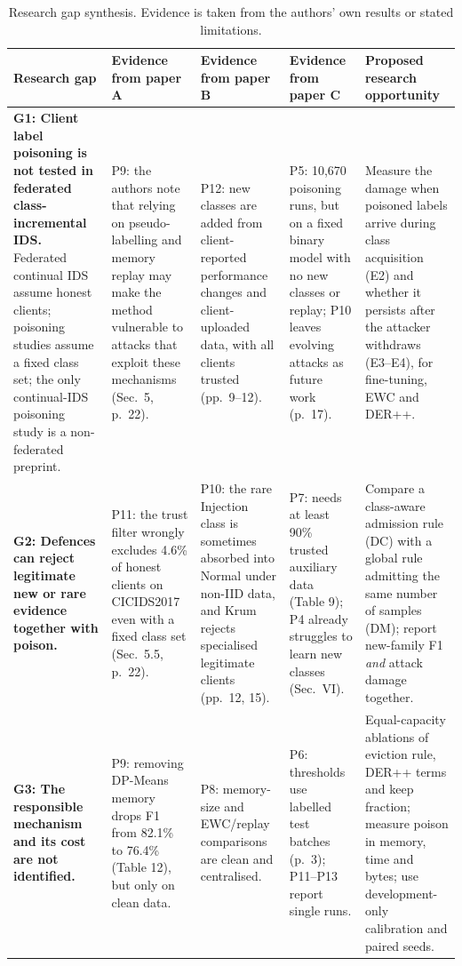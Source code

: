 \documentclass[10pt,a4paper]{article}
\begin{document}
\begin{landscape}
\begin{table}[p]
\centering\footnotesize
\caption{Research gap synthesis. Evidence is taken from the authors' own results or stated limitations.}
\label{tab:gaps}
\begin{tabularx}{\linewidth}{L{3.6cm}Y Y Y L{4.4cm}}
\toprule
Research gap & Evidence from paper A & Evidence from paper B & Evidence from paper C & Proposed research opportunity\\
\midrule
\textbf{G1: Client label poisoning is not tested in federated class-incremental IDS.} Federated continual IDS assume honest clients; poisoning studies assume a fixed class set; the only continual-IDS poisoning study is a non-federated preprint.
& P9: the authors note that relying on pseudo-labelling and memory replay may make the method vulnerable to attacks that exploit these mechanisms (Sec.~5, p.~22).
& P12: new classes are added from client-reported performance changes and client-uploaded data, with all clients trusted (pp.~9--12).
& P5: 10,670 poisoning runs, but on a fixed binary model with no new classes or replay; P10 leaves evolving attacks as future work (p.~17).
& Measure the damage when poisoned labels arrive during class acquisition (E2) and whether it persists after the attacker withdraws (E3--E4), for fine-tuning, EWC and DER++.\\[6pt]
\textbf{G2: Defences can reject legitimate new or rare evidence together with poison.}
& P11: the trust filter wrongly excludes 4.6\% of honest clients on CICIDS2017 even with a fixed class set (Sec.~5.5, p.~22).
& P10: the rare Injection class is sometimes absorbed into Normal under non-IID data, and Krum rejects specialised legitimate clients (pp.~12, 15).
& P7: needs at least 90\% trusted auxiliary data (Table 9); P4 already struggles to learn new classes (Sec.~VI).
& Compare a class-aware admission rule (DC) with a global rule admitting the same number of samples (DM); report new-family F1 \emph{and} attack damage together.\\[6pt]
\textbf{G3: The responsible mechanism and its cost are not identified.}
& P9: removing DP-Means memory drops F1 from 82.1\% to 76.4\% (Table 12), but only on clean data.
& P8: memory-size and EWC/replay comparisons are clean and centralised.
& P6: thresholds use labelled test batches (p.~3); P11--P13 report single runs.
& Equal-capacity ablations of eviction rule, DER++ terms and keep fraction; measure poison in memory, time and bytes; use development-only calibration and paired seeds.\\
\bottomrule
\end{tabularx}
\end{table}
\end{landscape}
\end{document}
